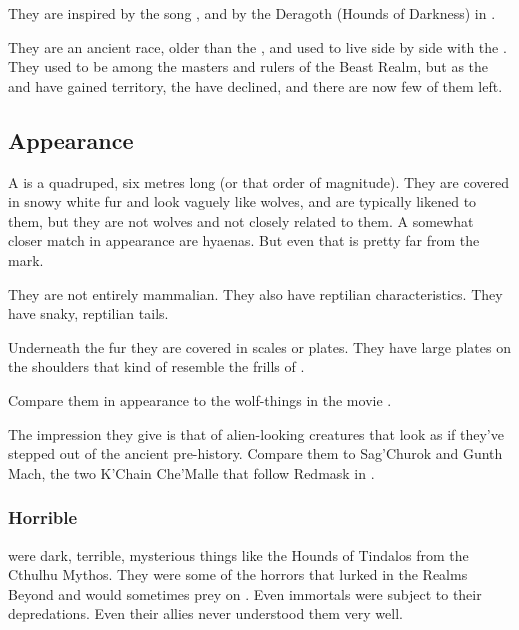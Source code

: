 They are inspired by the song , and by the Deragoth (Hounds of Darkness) in \cite{StevenEriksonIanCameronEsslemont:MalazanBookoftheFallen}. 

They are an ancient race, older than the \nephilim, and used to live side by side with the \ophidians. 
They used to be among the masters and rulers of the Beast Realm, but as the \dragons{} and \resphain{} have gained territory, the \moonwolves{} have declined, and there are now few of them left.







\subsection{Appearance}
A \vorcanth{} is a quadruped, six metres long (or that order of magnitude). 
They are covered in snowy white fur and look vaguely like wolves, and are typically likened to them, but they are not wolves and not closely related to them. 
A somewhat closer match in appearance are hyaenas. 
But even that is pretty far from the mark.

They are not entirely mammalian. 
They also have reptilian characteristics. 
They have snaky, reptilian tails. 

Underneath the fur they are covered in \armoured scales or plates. 
They have large \armour plates on the shoulders that kind of resemble the frills of \mulgrons. 

Compare them in appearance to the wolf-things in the movie . 

The impression they give is that of alien-looking creatures that look as if they've stepped out of the ancient pre-history. 
Compare them to Sag'Churok and Gunth Mach, the two K'Chain Che'Malle that follow Redmask in \MalazanReapersGale.





\subsubsection{Horrible}
\Vorcanths were dark, terrible, mysterious things like the Hounds of Tindalos from the Cthulhu Mythos. 
They were some of the horrors that lurked in the Realms Beyond and would sometimes prey on \Miithians. 
Even immortals were subject to their depredations. 
Even their \resphan allies never understood them very well. 









